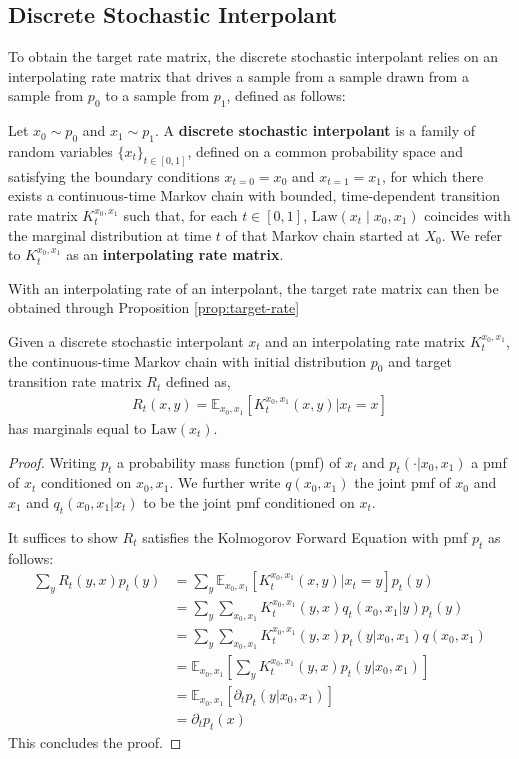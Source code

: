 \subsection{Discrete Stochastic Interpolant} \label{ref:discrete-interpolant}
To obtain the target rate matrix, the discrete stochastic interpolant relies on an interpolating rate matrix that drives a sample from a sample drawn from a sample from $p_0$ to a sample from $p_1$, defined as follows:
\begin{appdefinition}
Let \( x_0 \sim p_0 \) and \( x_1 \sim p_1 \). A \textbf{discrete stochastic interpolant} is a family of random variables \( \{x_t\}_{t \in [0,1]} \), defined on a common probability space and satisfying the boundary conditions \( x_{t=0} = x_0 \) and \( x_{t=1} = x_1 \), for which there exists a continuous-time Markov chain with bounded, time-dependent transition rate matrix \( K_t^{x_0, x_1} \) such that, for each \( t \in [0,1] \), $\text{Law}(x_t \mid x_0, x_1)$ coincides with the marginal distribution at time $t$ of that Markov chain started at $X_0$. We refer to \( K_t^{x_0, x_1} \) as an \textbf{interpolating rate matrix}.
\end{appdefinition}
With an interpolating rate of an interpolant, the target rate matrix can then be obtained through Proposition \ref{prop:target-rate}
\begin{appprop}\label{prop:target-rate}
Given a discrete stochastic interpolant $x_t$ and an interpolating rate matrix $K_t^{x_0, x_1}$, the continuous-time Markov chain with initial distribution $p_0$ and target transition rate matrix $R_t$ defined as,
\begin{align*}
    R_t(x, y) = \mathbb{E}_{x_0,x_1}[K_t^{x_0,x_1}(x, y) | x_t = x]
\end{align*}
has marginals equal to $\text{Law}(x_t)$.
\end{appprop}
\begin{proof}
Writing $p_t$ a probability mass function (pmf) of $x_t$ and $p_t(\cdot | x_0, x_1)$ a pmf of $x_t$ conditioned on $x_0, x_1$. We further write $q(x_0, x_1)$ the joint pmf of $x_0$ and $x_1$ and $q_t(x_0, x_1 | x_t)$ to be the joint pmf conditioned on $x_t$.

It suffices to show $R_t$ satisfies the Kolmogorov Forward Equation with pmf $p_t$ as follows:
\begin{align*}
    \sum_y R_t(y, x) p_t(y) &= \sum_y \mathbb{E}_{x_0,x_1}[K_t^{x_0,x_1}(x, y) | x_t = y] p_t(y) \\
    &= \sum_y \sum_{x_0, x_1}K_t^{x_0,x_1}(y, x) q_t(x_0, x_1|y) p_t(y) \\ 
    &= \sum_y \sum_{x_0, x_1}K_t^{x_0,x_1}(y, x) p_t(y | x_0, x_1) q(x_0, x_1) \\
    &= \mathbb{E}_{x_0,x_1} \left[ \sum_y K_t^{x_0,x_1}(y, x) p_t(y | x_0, x_1) \right] \\ 
    &= \mathbb{E}_{x_0, x_1} \left[\partial_t p_t(y | x_0, x_1)\right] \\ 
    &= \partial_t p_t(x)
\end{align*}
This concludes the proof.
\end{proof}

